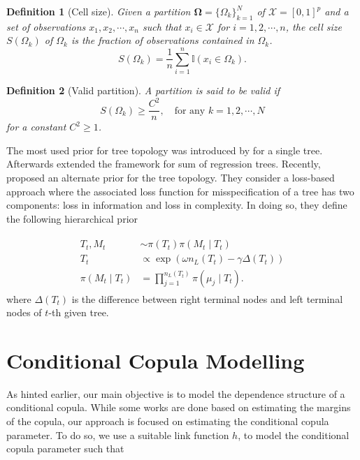 \documentclass{amsart}
\newtheorem{definition}{Definition}[section]
\begin{document}
\begin{definition}[Cell size] Given a partition $\mathbf{\Omega} = \{\Omega_k\}_{k=1}^N$ of $\mathcal{X} = [0,1]^p$ and a set of observations $x_1, x_2, \cdots, x_n$ such that $x_i\in \mathcal{X}$ for $i=1,2,\cdots, n$, the cell size $S(\Omega_k)$ of $\Omega_k$
	is the fraction of observations contained in $\Omega_k$.
	\begin{equation*}
		S(\Omega_k) = \frac{1}{n}\sum_{i=1}^n \mathbb{I}(x_i\in \Omega_k).
	\end{equation*}
\end{definition}

\begin{definition}[Valid partition]
	A partition is said to be valid if
	\begin{equation*}
		S(\Omega_k) \ge \frac{C^2}{n}, \quad\text{for any } k=1,2,\cdots, N
	\end{equation*}
	for a constant $C^2\ge 1$.
\end{definition}

The most used prior for tree topology was introduced by \citet{chipman98BCART} for a single tree. Afterwards \citet{chipman2010BART} extended the framework for sum of regression trees. Recently, \citet{serafini2024lossbasedpriortreetopologies} proposed an alternate prior for the tree topology. They consider a loss-based approach \cite{villa_loss-prior} where the associated loss function for misspecification of a tree has two components: loss in information and loss in complexity. In doing so, they define the following hierarchical prior

\begin{align}\label{eq:L-BART}
	\begin{split}
		T_t, M_t &\sim \pi(T_t)\pi(M_t\mid T_t)\\
		T_t &\propto \exp\left(\omega n_L(T_t)-\gamma\Delta(T_t)\right)\\
		\pi(M_t\mid T_t) & = \prod_{j=1}^{n_L(T_t)}\pi(\mu_j\mid T_t).
	\end{split}
\end{align}
where $\Delta(T_t)$ is the difference between right terminal nodes and left terminal nodes of $t$-th given tree.


\section{Conditional Copula Modelling}\label{sec:cond:cop}

As hinted earlier, our main objective is to model the dependence structure of a conditional copula. While some works are done based on estimating the margins of the copula, our approach is focused on estimating the conditional copula parameter. To do so, we use a suitable link function $h$, to model the conditional copula parameter such that 
\end{document}
